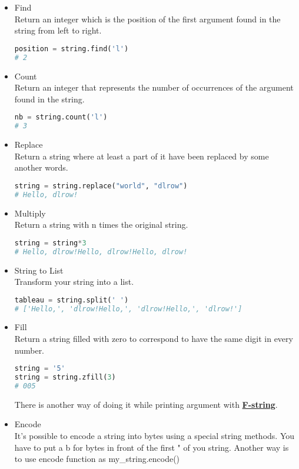 \documentclass[a4paper, 12pt, titlepage]{scrartcl} %
\begin{document}
\begin{itemize}
\item Find \\
Return an integer which is the position of the first argument found in the string from left to right.
\begin{lstlisting}[language=Python]
position = string.find('l')
# 2
\end{lstlisting} \vspace{5mm}

\item Count \\
Return an integer that represents the number of occurrences of the argument found in the string. 
\begin{lstlisting}[language=Python]
nb = string.count('l')
# 3
\end{lstlisting} \vspace{5mm}

\item Replace \\
Return a string where at least a part of it have been replaced by some another words.
\begin{lstlisting}[language=Python]
string = string.replace("world", "dlrow")
# Hello, dlrow!
\end{lstlisting} \vspace{5mm}

\item Multiply \\
Return a string with n times the original string.
\begin{lstlisting}[language=Python]
string = string*3
# Hello, dlrow!Hello, dlrow!Hello, dlrow!
\end{lstlisting} \vspace{5mm}

\item String to List \\
Transform your string into a list.
\begin{lstlisting}[language=Python]
tableau = string.split(' ')
# ['Hello,', 'dlrow!Hello,', 'dlrow!Hello,', 'dlrow!']
\end{lstlisting} \vspace{5mm}

\item Fill \\
Return a string filled with zero to correspond to have the same digit in every number.
\begin{lstlisting}[language=Python]
string = '5'
string = string.zfill(3)
# 005
\end{lstlisting} \vspace{5mm}

There is another way of doing it while printing argument with \hyperref[subsec:F-string]{\textbf{F-string}}.

\item Encode \\
It's possible to encode a string into bytes using a special string methods. You have to put a b for bytes in front of the first " of you string. Another way is to use encode function as my\_string.encode()
\end{itemize}
\end{document}
